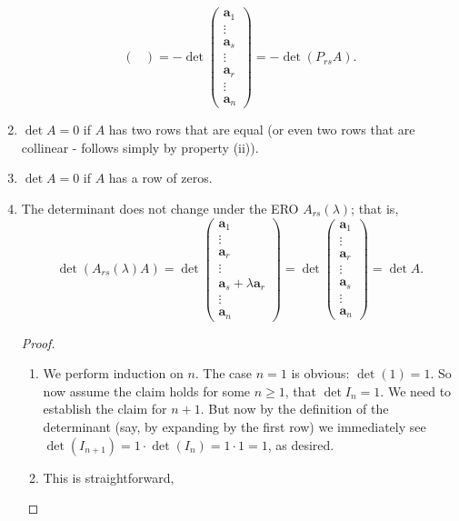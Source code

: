 \documentclass[10pt, a4paper]{article}
\newcommand{\mbf}[1]{\mathbf{#1}}
\begin{document}
\begin{enumerate}[label = (\roman*)]
\[\begin{pmatrix}
    \end{pmatrix}
    = -\det\begin{pmatrix}
        \mbf{a}_1 \\ \vdots \\ \mbf{a}_s \\ \vdots \\ \mbf{a}_r \\ \vdots \\ \mbf{a}_n
    \end{pmatrix}
    =
    -\det(P_{rs}A).
    \]
    \item $\det A = 0$ if $A$ has two rows that are equal
    (or even two rows that are collinear - follows simply by property (ii)).
    \item $\det A = 0$ if $A$ has a row of zeros.
    \item The determinant does not change under the ERO $A_{rs}(\lambda)$; that is,
    \[
    \det(A_{rs}(\lambda)A) = \det\begin{pmatrix}
        \mbf{a}_1 \\ \vdots \\ \mbf{a}_r \\ \vdots \\ \mbf{a}_s + \lambda\mbf{a}_r \\ \vdots \\ \mbf{a}_n
    \end{pmatrix}
    =
    \det\begin{pmatrix}
        \mbf{a}_1 \\ \vdots \\ \mbf{a}_r \\ \vdots \\ \mbf{a}_s \\ \vdots \\ \mbf{a}_n
    \end{pmatrix}
    = \det A.
    \]
    \begin{proof}
        \begin{enumerate}[label = (\roman*)]
            \item We perform induction on $n$.
            The case $n = 1$ is obvious:
            $\det(1) = 1$.
            So now assume the claim holds for some $n \geq 1$,
            that $\det I_n = 1$.
            We need to establish the claim for $n + 1$.
            But now by the definition of the determinant
            (say, by expanding by the first row)
            we immediately see $\det(I_{n + 1}) = 1\cdot\det(I_n) = 1 \cdot 1 = 1$,
            as desired.
            \item This is straightforward,

\end{enumerate}
\end{proof}
\end{enumerate}
\end{document}
